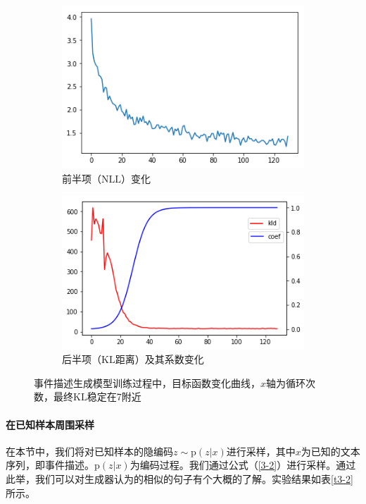 \begin{figure}[htb]
    \centering
	\begin{subfigure}{.4\textwidth}
		\includegraphics[width=\textwidth]{ce.png}
		\caption{前半项（$\mathrm{NLL}$）变化}
	\end{subfigure}
	\begin{subfigure}{.425\textwidth}
		\includegraphics[width=\textwidth]{ceof.png}
		\caption{后半项（$\mathrm{KL}$距离）及其系数变化}
    \end{subfigure}
    \caption{事件描述生成模型训练过程中，目标函数变化曲线，$x$轴为循环次数，最终$\mathrm{KL}$稳定在7附近}
    \label{f3-2}
\end{figure}

\paragraph{在已知样本周围采样}  
在本节中，我们将对已知样本的隐编码$z \sim \mathrm{p}(z|x)$进行采样，其中$x$为已知的文本序列，即事件描述。$\mathrm{p}(z|x)$为编码过程。我们通过公式（\ref{3-2}）进行采样。通过此举，我们可以对生成器认为的相似的句子有个大概的了解。实验结果如表\ref{t3-2}所示。 

